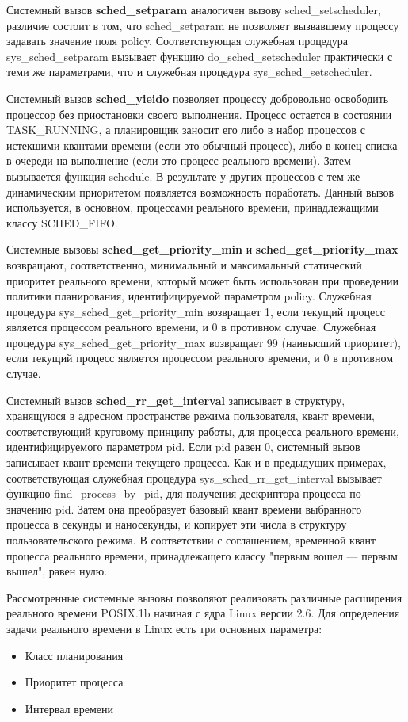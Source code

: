 Системный вызов \textbf{sched\_setparam} аналогичен вызову sched\_setscheduler, различие состоит в том, что sched\_setparam не позволяет вызвавшему процессу задавать значение поля policy. Соответствующая служебная процедура sys\_sched\_setparam вызывает функцию do\_sched\_setscheduler практически с теми же параметрами, что и служебная процедура sys\_sched\_setscheduler.

Системный вызов \textbf{sched\_yieido} позволяет процессу добровольно освободить процессор без приостановки своего выполнения. Процесс остается в состоянии TASK\_RUNNING, а планировщик заносит его либо в набор процессов с истекшими квантами времени (если это обычный процесс), либо в конец списка в очереди на выполнение (если это процесс реального времени). Затем вызывается функция schedule. В результате у других процессов с тем же динамическим приоритетом появляется возможность поработать. Данный вызов используется, в основном, процессами реального времени, принадлежащими классу SCHED\_FIFO.

Системные вызовы \textbf{sched\_get\_priority\_min} и \textbf{sched\_get\_priority\_max} возвращают, соответственно, минимальный и максимальный статический приоритет реального времени, который может быть использован при проведении политики планирования, идентифицируемой параметром policy. Служебная процедура sys\_sched\_get\_priority\_min возвращает 1, если текущий процесс является процессом реального времени, и 0 в противном случае. Служебная процедура sys\_sched\_get\_priority\_max возвращает 99 (наивысший приоритет), если текущий процесс является процессом реального времени, и 0 в противном случае.

Системный вызов \textbf{sched\_rr\_get\_interval} записывает в структуру, хранящуюся в адресном пространстве режима пользователя, квант времени, соответствующий круговому принципу работы, для процесса реального времени, идентифицируемого параметром pid. Если pid равен 0, системный вызов записывает квант времени текущего процесса. Как и в предыдущих примерах, соответствующая служебная процедура sys\_sched\_rr\_get\_interval вызывает функцию find\_process\_by\_pid, для получения дескриптора процесса по значению pid. Затем она преобразует базовый квант времени выбранного процесса в секунды и наносекунды, и копирует эти числа в структуру пользовательского режима. В соответствии с соглашением, временной квант процесса реального времени, принадлежащего классу "первым вошел — первым вышел", равен нулю.

Рассмотренные системные вызовы позволяют реализовать различные расширения реального времени POSIX.1b начиная с ядра Linux версии 2.6\cite{Raghavan}. Для определения задачи реального времени в Linux есть три основных параметра:
\begin{itemize}
\item Класс планирования
\item Приоритет процесса
\item Интервал времени
\end{itemize}
 
